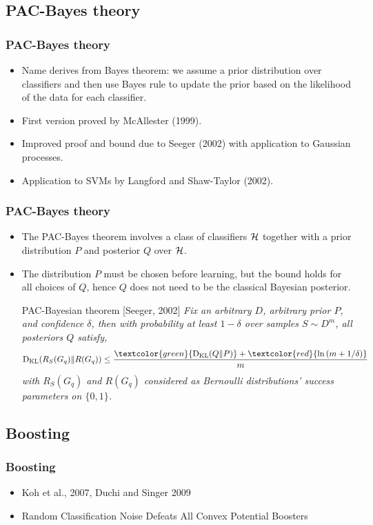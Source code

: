 \documentclass[mathserif]{beamer}
\begin{document}
\subsection{PAC-Bayes theory}
\begin{frame}
\frametitle{PAC-Bayes theory}
\begin{itemize}
\item Name derives from Bayes theorem: we assume a prior
distribution over  classifiers and then use
Bayes rule to update the prior based on the likelihood of
the data for each classifier.
\item First version proved by McAllester (1999).
\item Improved proof and bound due to Seeger (2002) with
 application to Gaussian processes.
\item Application to SVMs by Langford and Shaw-Taylor (2002).
 \end{itemize}
\end{frame}
%
\begin{frame}
\frametitle{PAC-Bayes theory}
\begin{itemize}
\item The PAC-Bayes theorem involves a class of classifiers ${\mathcal{H}}$
together with a prior distribution $P$ and posterior $Q$ over ${\mathcal{H}}$.
\item The distribution $P$ must be chosen before learning, but the
bound holds for all choices of $Q$, hence $Q$ does not need to
be the classical Bayesian posterior.
\begin{block}{PAC-Bayesian theorem [Seeger, 2002]}
 \textit{Fix an arbitrary $D$, arbitrary prior $P$, and confidence $\delta$, then with probability at least $1 -\delta$ over samples $S \sim D^m$, all
posteriors $Q$ satisfy,}
\begin{align*}
\KL(R_S(G_q)\Vert R(G_q)) \leq  \frac{   \textcolor{green}{\KL(Q \Vert P)}+\textcolor{red}{\ln{\paren{m+1/\delta} } }   }{m}
\end{align*}
 \textit{with $ R_S(G_q)$ and $R(G_q)$ considered as Bernoulli distributions' success parameters on $\{0,1\}$. }
\end{block}
 \end{itemize}
\end{frame}
%

\subsection{Boosting}
\begin{frame}
\frametitle{Boosting}
\begin{itemize}
\item Koh et al., 2007, Duchi and Singer
2009
\item Random Classification Noise
Defeats All Convex Potential Boosters
\end{itemize}
\end{frame}
\end{document}
